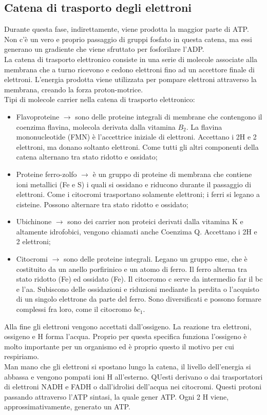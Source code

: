 \subsection{Catena di trasporto degli elettroni}
Durante questa fase, indirettamente, viene prodotta la maggior parte di ATP. Non c'\`e un vero e proprio passaggio di gruppi fosfato in questa catena, ma essi generano un gradiente che viene sfruttato per fosforilare l'ADP. 
\\La catena di trasporto elettronico consiste in una serie di molecole associate alla membrana che a turno ricevono e cedono elettroni fino ad un accettore finale di elettroni. L'energia prodotta viene utilizzata per pompare elettroni attraverso la membrana, creando la forza proton-motrice. 
\\Tipi di molecole carrier nella catena di trasporto elettronico:
\begin{itemize}
    \item Flavoproteine $\xrightarrow{}$ sono delle proteine integrali di membrane che contengono il coenzima flavina, molecola derivata dalla vitamina $B_2$. La flavina mononucleotide (FMN) \`e l'accettrice iniziale di elettroni. Accettano i 2H\ap{+} e 2 elettroni, ma donano soltanto elettroni. Come tutti gli altri componenti della catena alternano tra stato ridotto e ossidato;
    \item Proteine ferro-zolfo $\xrightarrow{}$ \`e un gruppo di proteine di membrana che contiene ioni metallici (Fe e S) i quali si ossidano e riducono durante il passaggio di elettroni. Come i citocromi trasportano solamente elettroni; i ferri si legano a cisteine. Possono alternare tra stato ridotto e ossidato;
    \item Ubichinone $\xrightarrow{}$ sono dei carrier non proteici derivati dalla vitamina K e altamente idrofobici, vengono chiamati anche Coenzima Q. Accettano i 2H\ap{+} e 2 elettroni;
    \item Citocromi $\xrightarrow{}$ sono delle proteine integrali. Legano un gruppo eme, che \`e costituito da un anello porfirinico e un atomo di ferro. Il ferro alterna tra stato ridotto (Fe) ed ossidato (Fe). Il citocromo c serve da intermedio far il bc e l'aa. Subiscono delle ossidazioni e riduzioni mediante la perdita o l'acquisto di un singolo elettrone da parte del ferro. Sono diversificati e possono formare complessi fra loro, come il citocromo $bc_1$.
\end{itemize}
Alla fine gli elettroni vengono accettati dall'ossigeno. La reazione tra elettroni, ossigeno e H\ap{+} forma l'acqua. Proprio per questa specifica funziona l'ossigeno \`e molto importante per un organismo ed \`e proprio questo il motivo per cui respiriamo.
\\Man mano che gli elettroni si spostano lungo la catena, il livello dell'energia si abbassa e vengono pompati ioni H\ap{+} all'esterno. QUesti derivano o dai trasportatori di elettroni NADH e FADH o dall'idrolisi dell'acqua nei citocromi. Questi protoni passando attraverso l'ATP sintasi, la quale gener ATP. Ogni 2 H\ap{+} viene, approssimativamente, generato un ATP.
